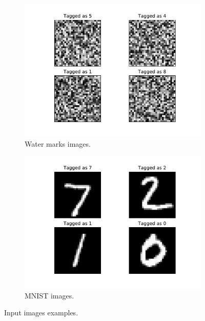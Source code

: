 \documentclass[a4paper]{easychair}
\begin{document}
\begin{figure}
  \centering
  \begin{subfigure}{0.4\linewidth}
    \includegraphics[width=\linewidth]{../data/wm.pdf}
     \caption{Water marks images.}
  \label{fig:noiseExample}
  \end{subfigure}
  \begin{subfigure}{0.4\linewidth}
    \includegraphics[width=\linewidth]{../data/mnist.pdf}
    \caption{MNIST images.}
  \label{fig:mnistExample}
  \end{subfigure}
\caption{Input images examples.}
\label{fig:inputExample}
\end{figure}
\end{document}
